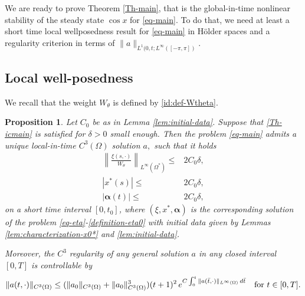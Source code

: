\documentclass[12pt]{amsart}
\renewcommand{\comment}[1]{\vskip.3cm
\fbox{%
\parbox{0.93\linewidth}{\footnotesize #1}}
\vskip.3cm}
\numberwithin{equation}{section}
\numberwithin{equation}{section}
\newtheorem{prop}[thm]{Proposition}
\begin{document}
 
 
We are ready to prove Theorem \ref{Th-main},  that is the global-in-time nonlinear stability of the steady state $\cos x$ for \eqref{eq-main}.  To do that,   we need  at least a short time  local wellposedness  result for \eqref{eq-main} in H\"older spaces and  a regularity criterion in terms of $\|a\|_{L^1(0,  t;  L^\infty([-\pi, \pi ])}.$

\subsection{Local well-posedness}

We recall that the weight $W_\theta$ is defined by \eqref{id:def-Wtheta}.

\begin{prop}\label{LWP}
Let $C_0$ be as in Lemma \ref{lem:initial-data}. Suppose that \eqref{Th-icmain} is satisfied for $\delta>0$ small enough. Then the problem
\eqref{eq-main}  admits a unique local-in-time $C^3(\Omega)$ solution $a,$ such that it holds
 \begin{align}
  \left\|\frac{\xi(s, \cdot)}{W_\theta}\right\|_{L^\infty(\Omega^*)}\leq& 2C_0 \delta, \label{bd:bootstrap1}\\
    |x^*(s)|\leq& 2C_0 \delta, \label{bd:bootstrap2}\\
|\boldsymbol{\alpha}(t)|\leq& 2C_0\delta,\label{bd:bootstrap3}
 \end{align}
 on a short time interval $[0,t_0]$, where $(\xi,  x^*,   \boldsymbol\alpha)$ is the corresponding solution of the problem \eqref{eq-eta}-\eqref{definition-eta0} with initial data given by Lemmas \ref{lem:characterization-x0*} and \ref{lem:initial-data}.

Moreover,   the $ C^3$ regularity of any general solution $a$ in any closed interval $[0, T]$ is controllable by
\begin{equation}\label{BKM}
\|a(t,   \cdot)\|_{ C^3(\Omega)}\leq (\|a_0\|_{ C^3(\Omega)}+\|a_0\|_{ C^3(\Omega)}^3)(t+1)^2\,e^{C\int_0^t \|a(\bar t,  \cdot)\|_{L^\infty(\Omega)}\,d\bar t}\quad {\rm for}~t\in[0, T].
\end{equation}

 \end{prop}
 
\end{document}
